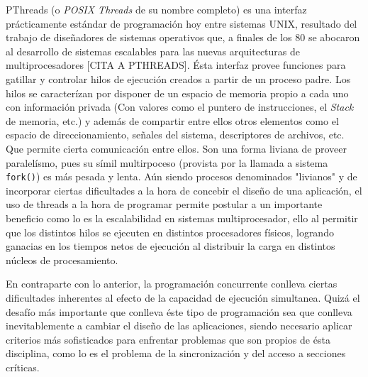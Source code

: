 PThreads (o \emph{POSIX Threads} de su nombre completo) es una interfaz prácticamente estándar de programación hoy entre sistemas UNIX, resultado del trabajo de diseñadores de sistemas operativos que, a finales de los 80 se abocaron al desarrollo de sistemas escalables para las nuevas arquitecturas de multiprocesadores [CITA A PTHREADS]. Ésta interfaz provee funciones para gatillar y controlar hilos de ejecución creados a partir de un proceso padre. Los hilos se caracterízan por disponer de un espacio de memoria propio a cada uno con información privada (Con valores como el puntero de instrucciones, el \emph{Stack} de memoria, etc.) y además de compartir entre ellos otros elementos como el espacio de direccionamiento, señales del sistema, descriptores de archivos, etc. Que permite cierta comunicación entre ellos. Son una forma liviana de proveer paralelísmo, pues su símil multirpoceso (provista por la llamada a sistema \verb=fork()=) es más pesada y lenta. Aún siendo procesos denominados "livianos" y de incorporar ciertas dificultades a la hora de concebir el diseño de una aplicación, el uso de threads a la hora de programar permite postular a un importante beneficio como lo es la escalabilidad en sistemas multiprocesador, ello al permitir que los distintos hilos se ejecuten en distintos procesadores físicos, logrando ganacias en los tiempos netos de ejecución al distribuir la carga en distintos núcleos de procesamiento.

En contraparte con lo anterior, la programación concurrente conlleva ciertas dificultades inherentes al efecto de la capacidad de ejecución simultanea. Quizá el desafío más importante que conlleva éste tipo de programación sea que conlleva inevitablemente a cambiar el diseño de las aplicaciones, siendo necesario aplicar criterios más sofisticados para enfrentar problemas que son propios de ésta disciplina, como lo es el problema de la sincronización y del acceso a secciones críticas.


